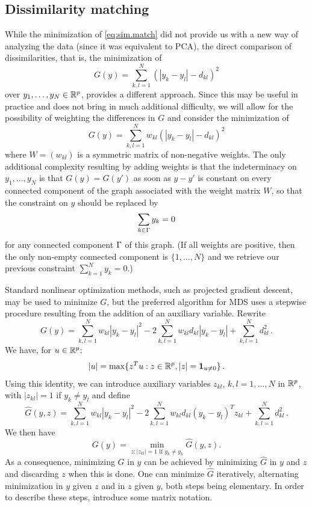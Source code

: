 \subsection{Dissimilarity matching}
While the minimization of \cref{eq:sim.match} did not provide us with a new way of analyzing the data (since it was equivalent to PCA), the direct comparison of dissimilarities, that is, the minimization of 
\[
G(y) = \sum_{k,l=1}^N (|y_k-y_l| - d_{kl})^2
\]
over $y_1, \ldots, y_N\in {\mathbb{R}}^p$, provides a different approach.  Since this may be useful in practice and does not bring in much additional difficulty, we will allow for the possibility of weighting the differences in $G$ and consider the minimization of 
\[
G(y) = \sum_{k,l=1}^N w_{kl}(|y_k-y_l| - d_{kl})^2
\]
where $W = (w_{kl})$ is a symmetric matrix of non-negative weights. The only additional complexity resulting by adding weights is that the indeterminacy on $y_1, \ldots, y_N$ is that $G(y)=G(y')$ as soon as $y-y'$ is constant on every connected component of the graph associated with the weight matrix $W$, so that the constraint on $y$ should be replaced by
\[
\sum_{k\in \Gamma} y_k = 0
\]
for any connected component $\Gamma$ of this graph. (If all weights are positive, then the only non-empty connected component is $\{1, \ldots, N\}$ and we retrieve our previous constraint  $\sum_{k=1}^N y_k = 0$.)

Standard nonlinear optimization methods, such as projected gradient descent, may be used to minimize $G$, but the preferred algorithm for MDS uses a stepwise procedure resulting from the addition of an auxiliary variable.
Rewrite
\[
G(y) = \sum_{k,l=1}^N w_{kl} |y_k-y_l|^2 - 2 \sum_{k,l=1}^N w_{kl} d_{kl} |y_k-y_l| + \sum_{k,l=1}^N d_{kl}^2\,.
\]
We have,  for $u\in {\mathbb{R}}^p$: 
\[
|u| = \max\{z^T u: z\in {\mathbb{R}}^p, |z| = {\bm 1}_{u\neq 0}\}\,.
\]
Using this identity, we can  introduce auxiliary variables $z_{kl}$, $k,l=1, \ldots, N$ in ${\mathbb{R}}^p$, with $|z_{kl}| = 1$ if $y_k\neq y_l$ and  define
\[
\hat G(y,z) = \sum_{k,l=1}^N w_{kl} |y_k-y_l|^2 - 2 \sum_{k,l=1}^N w_{kl} d_{kl} (y_k-y_l)^T z_{kl} + \sum_{k,l=1}^N d_{kl}^2\,.
\]
We then have
\[
G(y) = \min_{z: |z_{kl}|=1 \text{ if } y_k\neq y_k} \hat G(y,z).
\]
As a consequence,  minimizing $G$ in $y$ can be achieved by minimizing $\hat G$ in $y$ and $z$ and discarding $z$ when this is done. One can minimize $\hat G$ iteratively, alternating minimization in $y$ given $z$ and in $z$ given $y$, both steps being elementary. In order to describe these steps, introduce some matrix notation. 

